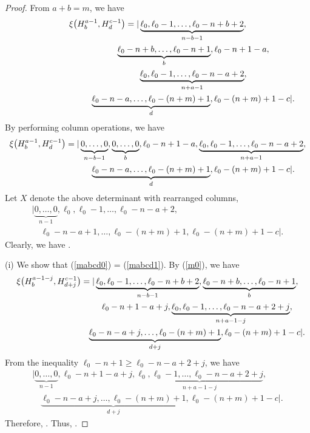 \documentclass[pdftex]{sigma}
\numberwithin{equation}{section}
\begin{document}
\begin{proof}
From $a+b=m$, we have
\begin{gather}
\xi\bigl(H^{a-1}_{b},H^{c-1}_{d}\bigr)=|\underbrace{\ell_{0},\ell_{0}-1,\dots,\ell_{0}-n+b+2}_{n-b-1},\nonumber\\
\hphantom{\xi\bigl(H^{a-1}_{b},H^{c-1}_{d}\bigr)=|}{}
\underbrace{\ell_{0}-n+b,\dots,\ell_{0}-n+1}_{b},\ell_{0}-n+1-a,\nonumber\\
\hphantom{\xi\bigl(H^{a-1}_{b},H^{c-1}_{d}\bigr)=|}{}
\underbrace{\ell_{0},\ell_{0}-1,\dots,\ell_{0}-n-a+2}_{n+a-1},\nonumber\\
\hphantom{\xi\bigl(H^{a-1}_{b},H^{c-1}_{d}\bigr)=|}{}
\underbrace{\ell_{0}-n-a,\dots,\ell_{0}-(n+m)+1}_{d},\ell_{0}-(n+m)+1-c|.
\label{m0}
\end{gather}
By performing column operations, we have
\begin{gather*}
\xi\bigl(H^{a-1}_{b},H^{c-1}_{d}\bigr)=|\underbrace{0,\dots,0}_{n-b-1},%
\underbrace{0,\dots,0}_{b},\ell_{0}-n+1-a,
\underbrace{\ell_{0},\ell_{0}-1,\dots,\ell_{0}-n-a+2}_{n+a-1},\nonumber\\
\hphantom{\xi\bigl(H^{a-1}_{b},H^{c-1}_{d}\bigr)=|}{}
\underbrace{\ell_{0}-n-a,\dots,\ell_{0}-(n+m)+1}_{d},\ell_{0}-(n+m)+1-c|\nonumber.
\end{gather*}
Let $X$ denote the above determinant with rearranged columns,
\begin{gather*}
| \underbrace{0,\dots,0}_{n-1},
\ell_{0},\ell_{0}-1,\dots,\ell_{0}-n-a+2,\\
\quad{}\ell_{0}-n-a+1,\dots,\ell_{0}-(n+m)+1,\ell_{0}-(n+m)+1-c|\nonumber.
\end{gather*}
Clearly, we have
.

(i) We show that (\ref{mabcd0}) = (\ref{mabcd1}). By (\ref{m0}), we have
\begin{gather*}
\xi\bigl(H^{a-1-j}_{b},H^{c-1}_{d+j}\bigr)=|\underbrace{\ell_{0},\ell_{0}-1,\dots,\ell_{0}-n+b+2}_{n-b-1},\underbrace{\ell_{0}-n+b,\dots,\ell_{0}-n+1}_{b},\nonumber\\
\hphantom{\xi\bigl(H^{a-1-j}_{b},H^{c-1}_{d+j}\bigr)=|}{}\,
\ell_{0}-n+1-a+j,\underbrace{\ell_{0},\ell_{0}-1,\dots,\ell_{0}-n-a+2+j}_{n+a-1-j},\nonumber\\
\hphantom{\xi\bigl(H^{a-1-j}_{b},H^{c-1}_{d+j}\bigr)=|}{}
\underbrace{\ell_{0}-n-a+j,\dots,\ell_{0}-(n+m)+1}_{d+j},\ell_{0}-(n+m)+1-c|\nonumber.
\end{gather*}
From the inequality $\ell_0-n+1\geq\ell_0-n-a+2+j$, we have
\begin{gather*}
|\underbrace{0,\dots,0}_{n-1},\ell_{0}-n+1-a+j,\underbrace{\ell_{0},\ell_{0}-1,\dots,\ell_{0}-n-a+2+j}_{n+a-1-j},\nonumber\\
\quad{}\underbrace{\ell_{0}-n-a+j,\dots,\ell_{0}-(n+m)+1}_{d+j},\ell_{0}-(n+m)+1-c|\nonumber.
\end{gather*}
Therefore, . Thus, .


\end{proof}
\end{document}
